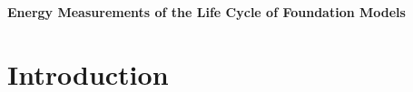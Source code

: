 \documentclass{article}
\begin{document}
    \center \Large{\textbf{Energy Measurements of the Life Cycle of Foundation Models}}

    \section{Introduction}
    {
        \lipsum[1]
    }
\end{document}
